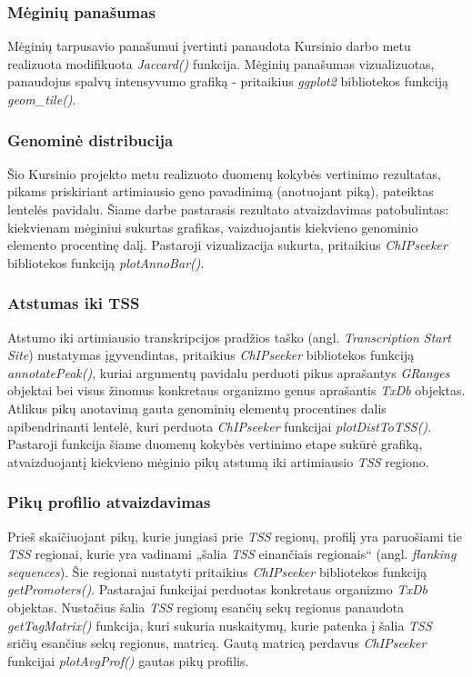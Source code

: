 \documentclass[12pt]{article}
\begin{document}
\subsubsection*{Mėginių panašumas}
Mėginių tarpusavio panašumui įvertinti panaudota Kursinio darbo metu
realizuota modifikuota \emph{Jaccard()} funkcija. Mėginių panašumas
vizualizuotas, panaudojus spalvų intensyvumo grafiką - pritaikius
\emph{ggplot2}\cite{GGPLOT2} bibliotekos funkciją \emph{geom\_tile()}.

\subsubsection*{Genominė distribucija}
Šio Kursinio projekto metu realizuoto duomenų kokybės vertinimo rezultatas,
pikams priskiriant artimiausio geno pavadinimą (anotuojant piką), pateiktas
lentelės pavidalu. Šiame darbe pastarasis rezultato atvaizdavimas patobulintas:
kiekvienam mėginiui sukurtas grafikas, vaizduojantis kiekvieno genominio
elemento procentinę dalį. Pastaroji vizualizacija sukurta, pritaikius
\emph{ChIPseeker}\cite{CHIPSEEKER} bibliotekos funkciją \emph{plotAnnoBar()}.

\subsubsection*{Atstumas iki TSS}
Atstumo iki artimiausio transkripcijos pradžios taško
(angl. \emph{Transcription Start Site}) nustatymas įgyvendintas, pritaikius
\emph{ChIPseeker} bibliotekos funkciją \emph{annotatePeak()}, kuriai argumentų
pavidalu perduoti pikus aprašantys \emph{GRanges}\cite{GRANGES} objektai bei
visus žinomus konkretaus organizmo genus aprašantis \emph{TxDb}\cite{TXDB_MM}
objektas. Atlikus pikų anotavimą gauta genominių elementų procentines dalis
apibendrinanti lentelė, kuri perduota \emph{ChIPseeker} funkcijai
\emph{plotDistToTSS()}. Pastaroji funkcija šiame duomenų kokybės vertinimo
etape sukūrė grafiką, atvaizduojantį kiekvieno mėginio pikų atstumą iki
artimiausio \emph{TSS} regiono.

\subsubsection*{Pikų profilio atvaizdavimas}
Prieš skaičiuojant pikų, kurie jungiasi prie \emph{TSS} regionų, profilį yra
paruošiami tie \emph{TSS} regionai, kurie yra vadinami „šalia \emph{TSS}
einančiais regionais“ (angl. \emph{flanking sequences}). Šie regionai nustatyti
pritaikius \emph{ChIPseeker} bibliotekos funkciją \emph{getPromoters()}.
Pastarajai funkcijai perduotas konkretaus organizmo \emph{TxDb} objektas.
Nustačius šalia \emph{TSS} regionų esančių sekų regionus panaudota
\emph{getTagMatrix()} funkcija, kuri sukuria nuskaitymų, kurie patenka į šalia
\emph{TSS} sričių esančius sekų regionus, matricą. Gautą matricą perdavus
\emph{ChIPseeker} funkcijai \emph{plotAvgProf()} gautas pikų profilis.
\end{document}
